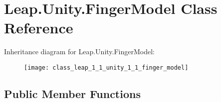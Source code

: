 \hypertarget{class_leap_1_1_unity_1_1_finger_model}{}\section{Leap.\+Unity.\+Finger\+Model Class Reference}
\label{class_leap_1_1_unity_1_1_finger_model}
Inheritance diagram for Leap.\+Unity.\+Finger\+Model\+:\begin{figure}[H]
\begin{center}
\leavevmode
\texttt{[image: class\_leap\_1\_1\_unity\_1\_1\_finger\_model]}
\end{center}
\end{figure}
\subsection*{Public Member Functions}
